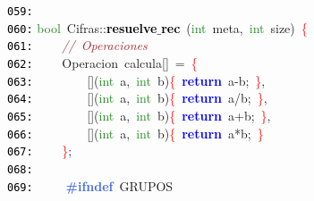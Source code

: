 \documentclass[a4paper,10pt]{scrartcl}
\begin{document}
{   \mbox{}\texttt{\textcolor{Black}{059:}}  \\
   \mbox{}\texttt{\textcolor{Black}{060:}} \textcolor{ForestGreen}{bool}\ Cifras\textcolor{BrickRed}{::}\textbf{\textcolor{Black}{resuelve$\_$rec}}\ \textcolor{BrickRed}{(}\textcolor{ForestGreen}{int}\ meta\textcolor{BrickRed}{,}\ \textcolor{ForestGreen}{int}\ size\textcolor{BrickRed}{)}\ \textcolor{Red}{\{} \\
   \mbox{}\texttt{\textcolor{Black}{061:}} \ \ \ \ \textit{\textcolor{Brown}{//\ Operaciones}} \\
   \mbox{}\texttt{\textcolor{Black}{062:}} \ \ \ \ \textcolor{TealBlue}{Operacion}\ calcula\textcolor{BrickRed}{[]}\ \textcolor{BrickRed}{=}\ \textcolor{Red}{\{} \\
   \mbox{}\texttt{\textcolor{Black}{063:}} \ \ \ \ \ \ \ \ \textcolor{BrickRed}{[](}\textcolor{ForestGreen}{int}\ a\textcolor{BrickRed}{,}\ \textcolor{ForestGreen}{int}\ b\textcolor{BrickRed}{)}\textcolor{Red}{\{}\ \textbf{\textcolor{Blue}{return}}\ a\textcolor{BrickRed}{-}b\textcolor{BrickRed}{;}\ \textcolor{Red}{\}}\textcolor{BrickRed}{,} \\
   \mbox{}\texttt{\textcolor{Black}{064:}} \ \ \ \ \ \ \ \ \textcolor{BrickRed}{[](}\textcolor{ForestGreen}{int}\ a\textcolor{BrickRed}{,}\ \textcolor{ForestGreen}{int}\ b\textcolor{BrickRed}{)}\textcolor{Red}{\{}\ \textbf{\textcolor{Blue}{return}}\ a\textcolor{BrickRed}{/}b\textcolor{BrickRed}{;}\ \textcolor{Red}{\}}\textcolor{BrickRed}{,} \\
   \mbox{}\texttt{\textcolor{Black}{065:}} \ \ \ \ \ \ \ \ \textcolor{BrickRed}{[](}\textcolor{ForestGreen}{int}\ a\textcolor{BrickRed}{,}\ \textcolor{ForestGreen}{int}\ b\textcolor{BrickRed}{)}\textcolor{Red}{\{}\ \textbf{\textcolor{Blue}{return}}\ a\textcolor{BrickRed}{+}b\textcolor{BrickRed}{;}\ \textcolor{Red}{\}}\textcolor{BrickRed}{,} \\
   \mbox{}\texttt{\textcolor{Black}{066:}} \ \ \ \ \ \ \ \ \textcolor{BrickRed}{[](}\textcolor{ForestGreen}{int}\ a\textcolor{BrickRed}{,}\ \textcolor{ForestGreen}{int}\ b\textcolor{BrickRed}{)}\textcolor{Red}{\{}\ \textbf{\textcolor{Blue}{return}}\ a\textcolor{BrickRed}{*}b\textcolor{BrickRed}{;}\ \textcolor{Red}{\}} \\
   \mbox{}\texttt{\textcolor{Black}{067:}} \ \ \ \ \textcolor{Red}{\}}\textcolor{BrickRed}{;} \\
   \mbox{}\texttt{\textcolor{Black}{068:}} \ \ \ \  \\
   \mbox{}\texttt{\textcolor{Black}{069:}} \textbf{\textcolor{RoyalBlue}{\ \ \ \ \#ifndef}}\ GRUPOS \\
}
\end{document}
